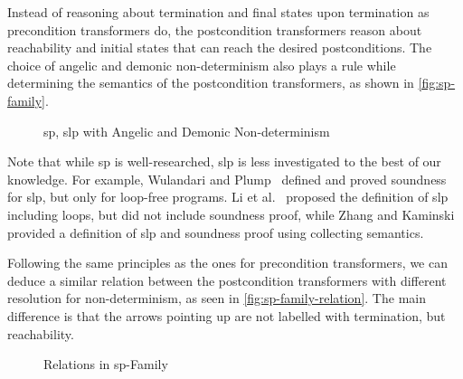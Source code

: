 Instead of reasoning about termination and final states upon termination as precondition transformers do, the postcondition transformers reason about reachability and initial states that can reach the desired postconditions. 
The choice of angelic and demonic non-determinism also plays a rule while determining the semantics of the postcondition transformers, as shown in \autoref{fig:sp-family}. 

\begin{figure}[ht]\centering
	\hfill

	\hfill
	\caption{sp, slp with Angelic and Demonic Non-determinism}
	\label{fig:sp-family}
\end{figure}

Note that while sp is well-researched, slp is less investigated to the best of our knowledge. 
For example, Wulandari and Plump~\cite{wulandari2020VerifyingGraphPrograms} defined and proved soundness for slp, but only for loop-free programs. 
Li et al.~\cite{li2011NonlinearMathematicsUncertainty} proposed the definition of slp including loops, but did not include soundness proof, while Zhang and Kaminski~\cite{zhang22-full} provided a definition of slp and soundness proof using collecting semantics. 

Following the same principles as the ones for precondition transformers, we can deduce a similar relation between the postcondition transformers with different resolution for non-determinism, as seen in \autoref{fig:sp-family-relation}. 
The main difference is that the arrows pointing up are not labelled with termination, but reachability. 

\begin{figure}[t]
	\centering
	
	\caption{Relations in sp-Family}
	\label{fig:sp-family-relation}
\end{figure}

